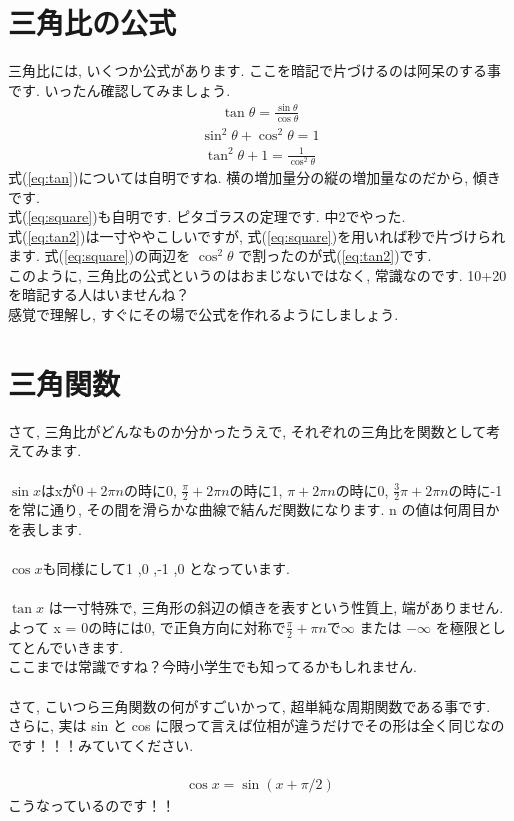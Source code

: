 \documentclass[11pt,a4paper]{jreport}
\begin{document}
\section{三角比の公式}
三角比には, いくつか公式があります. ここを暗記で片づけるのは阿呆のする事です. いったん確認してみましょう.
\begin{eqnarray}
\tan \theta = \frac{\sin\theta}{\cos\theta}
\label{eq:tan}
\end{eqnarray}
\begin{eqnarray}
\sin^2 \theta + \cos^2\theta = 1
\label{eq:square}
\end{eqnarray}
\begin{eqnarray}
\tan^2\theta + 1 = \frac{1}{\cos^2\theta}
\label{eq:tan2}
\end{eqnarray}
式(\ref{eq:tan})については自明ですね. 横の増加量分の縦の増加量なのだから, 傾きです.\\
式(\ref{eq:square})も自明です. ピタゴラスの定理です. 中2でやった. \\
式(\ref{eq:tan2})は一寸ややこしいですが, 式(\ref{eq:square})を用いれば秒で片づけられます. 式(\ref{eq:square})の両辺を $\cos^2\theta$ で割ったのが式(\ref{eq:tan2})です.\\
このように, 三角比の公式というのはおまじないではなく, 常識なのです. 10+20を暗記する人はいませんね？\\
感覚で理解し, すぐにその場で公式を作れるようにしましょう. 


\section{三角関数}
さて, 三角比がどんなものか分かったうえで, それぞれの三角比を関数として考えてみます.\\
\\
 $\sin x $はxが$0 + 2\pi n$の時に0, $\frac{\pi}{2} + 2\pi n$の時に1, $\pi + 2\pi n$の時に0, $\frac{3}{2}\pi + 2\pi n$の時に-1を常に通り, その間を滑らかな曲線で結んだ関数になります. n の値は何周目かを表します.\\
\\
$\cos x $も同様にして1 ,0 ,-1 ,0 となっています. \\
\\
$\tan x$ は一寸特殊で, 三角形の斜辺の傾きを表すという性質上, 端がありません. よって x = 0の時には0, で正負方向に対称で$\frac{\pi}{2} + \pi n$で$\infty$ または $-\infty$ を極限としてとんでいきます.\\


ここまでは常識ですね？今時小学生でも知ってるかもしれません.\\
\\
さて, こいつら三角関数の何がすごいかって, 超単純な周期関数である事です. \\
さらに, 実は sin と cos に限って言えば位相が違うだけでその形は全く同じなのです！！！みていてください.\\
\\
\begin{eqnarray}
\cos x = \sin (x + \pi/2)
\end{eqnarray}
こうなっているのです！！
\\
\end{document}
